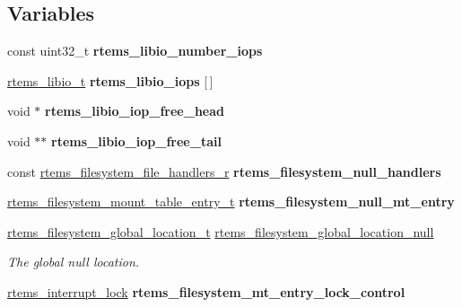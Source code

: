 \subsection*{Variables}
\begin{DoxyCompactItemize}
\item 
\mbox{\label{group__LibIOInternal_gac8c42891dcf02e83f6479335264acaaa}} 
const uint32\+\_\+t {\bfseries rtems\+\_\+libio\+\_\+number\+\_\+iops}
\item 
\mbox{\label{group__LibIOInternal_ga8a4ee1d5097ae97772b934d57eaaabcc}} 
\mbox{\hyperlink{structrtems__libio__tt}{rtems\+\_\+libio\+\_\+t}} {\bfseries rtems\+\_\+libio\+\_\+iops} \mbox{[}$\,$\mbox{]}
\item 
\mbox{\label{group__LibIOInternal_ga422aa477a6c925d8119ea52e014383e5}} 
void $\ast$ {\bfseries rtems\+\_\+libio\+\_\+iop\+\_\+free\+\_\+head}
\item 
\mbox{\label{group__LibIOInternal_gac5879106b7aa4f023988311a152cee50}} 
void $\ast$$\ast$ {\bfseries rtems\+\_\+libio\+\_\+iop\+\_\+free\+\_\+tail}
\item 
\mbox{\label{group__LibIOInternal_gaf26d30934ac1aefe46bfa04b1309ce58}} 
const \mbox{\hyperlink{struct__rtems__filesystem__file__handlers__r}{rtems\+\_\+filesystem\+\_\+file\+\_\+handlers\+\_\+r}} {\bfseries rtems\+\_\+filesystem\+\_\+null\+\_\+handlers}
\item 
\mbox{\label{group__LibIOInternal_ga8af3ab997a664d38e981781d818dddde}} 
\mbox{\hyperlink{structrtems__filesystem__mount__table__entry__tt}{rtems\+\_\+filesystem\+\_\+mount\+\_\+table\+\_\+entry\+\_\+t}} {\bfseries rtems\+\_\+filesystem\+\_\+null\+\_\+mt\+\_\+entry}
\item 
\mbox{\hyperlink{structrtems__filesystem__global__location__t}{rtems\+\_\+filesystem\+\_\+global\+\_\+location\+\_\+t}} \mbox{\hyperlink{group__LibIOInternal_ga2a1ff10ed80896b794427789c2c44a4b}{rtems\+\_\+filesystem\+\_\+global\+\_\+location\+\_\+null}}
\begin{DoxyCompactList}\small\item\em The global null location. \end{DoxyCompactList}\item 
\mbox{\label{group__LibIOInternal_gaffd9caabbbd51593864197d310064e27}} 
\mbox{\hyperlink{group__ClassicINTRLocks_ga7d4b54b01fd1507aa842d5fbc7b11177}{rtems\+\_\+interrupt\+\_\+lock}} {\bfseries rtems\+\_\+filesystem\+\_\+mt\+\_\+entry\+\_\+lock\+\_\+control}
\end{DoxyCompactItemize}


